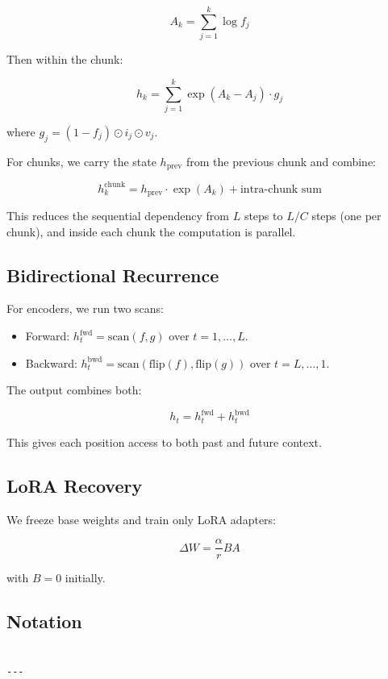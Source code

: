 \[
A_k = \sum_{j=1}^{k} \log f_j
\tag{3.6}
\]

Then within the chunk:

\[
h_k = \sum_{j=1}^{k} \exp(A_k - A_j) \cdot g_j
\tag{3.7}
\]

where $g_j = (1 - f_j) \odot i_j \odot v_j$.

For chunks, we carry the state $h_\text{prev}$ from the previous chunk and 
combine:

\[
h_k^\text{chunk} = h_\text{prev} \cdot \exp(A_k) + \text{intra-chunk sum}
\tag{3.8}
\]

This reduces the sequential dependency from $L$ steps to $L / C$ steps 
(one per chunk), and inside each chunk the computation is parallel.

\subsection{Bidirectional Recurrence}

For encoders, we run two scans:

\begin{itemize}
\item Forward: $h_t^\text{fwd} = \text{scan}(f, g)$ over $t = 1, \ldots, L$.
\item Backward: $h_t^\text{bwd} = \text{scan}(\text{flip}(f), \text{flip}(g))$ over
  $t = L, \ldots, 1$.

\end{itemize}
The output combines both:

\[
h_t = h_t^\text{fwd} + h_t^\text{bwd}
\tag{3.9}
\]

This gives each position access to both past and future context.

\subsection{LoRA Recovery}

We freeze base weights and train only LoRA adapters:

\[
\Delta W = \frac{\alpha}{r} B A
\tag{3.10}
\]

with $B = 0$ initially.

\subsection{Notation}

\begin{lstlisting}

---
\end{lstlisting}